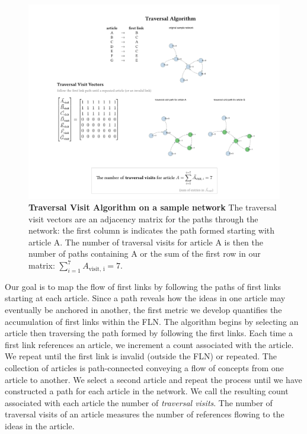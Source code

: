 \documentclass[pre,twocolumn,twoside,superscriptaddress,floatfix, aps, 10pt]{revtex4-1}
\begin{document}
\begin{figure}[tp!]
  \centering	
  \includegraphics[width=\textwidth]{graphics/traversal_visit_algo_figure.pdf}  
  \caption{
    \textbf{Traversal Visit Algorithm on a sample network}
     The traversal visit vectors are an adjacency matrix for the paths through the network: the first column is indicates the path formed starting with article A. The number of traversal visits for article A is then the number of paths containing A or the sum of the first row in our matrix:
     $\sum_{i=1}^7 A_{\text{visit, i}} = 7$.
  }
  \label{fig:Traversal Visits}
\end{figure}

Our goal is to map the flow of first links by following the paths of first links 
starting at each article. 
Since a path reveals how the ideas in one article may eventually be 
anchored in another, the first metric we develop quantifies the accumulation of first links 
within the FLN. 
The algorithm begins by selecting an article then traversing the path formed
by following the first links. Each time a first link references an article, we increment a count
associated with the article. 
We repeat until the first link is invalid (outside the FLN) or repeated. The collection of articles is path-connected conveying a flow of concepts from one article to another. 
We select a second article and repeat the process until we have 
constructed a path for each article in the network. We call the resulting count associated with each article the number of {\it traversal visits}. The number of traversal visits of an article 
measures the number of references flowing to the ideas in the article. 
\end{document}
